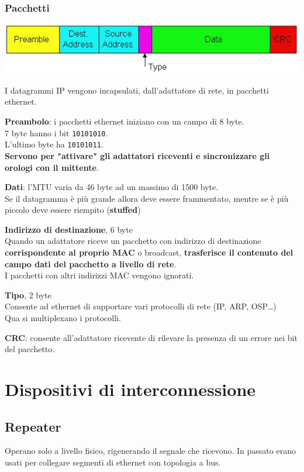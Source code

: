 \documentclass[10pt]{article}
\begin{document}
\subsubsection{Pacchetti}
\begin{center}
	\includegraphics[scale=0.7]{ethernetpkt.png}
\end{center}
I datagrammi IP vengono incapsulati, dall'adattatore di rete, in pacchetti ethernet.
\begin{list}{}{}
	\item \textbf{Preambolo}: i pacchetti ethernet iniziano con un campo di 8 byte.\\
	7 byte hanno i bit \texttt{10101010}.\\
	L'ultimo byte ha \texttt{10101011}.\\
	\textbf{Servono per "attivare" gli adattatori riceventi e sincronizzare gli orologi con il mittente}.
	\item \textbf{Dati}: l'MTU varia da 46 byte ad un massimo di 1500 byte.\\
	Se il datagramma è più grande allora deve essere frammentato, mentre se è più piccolo deve essere riempito (\textbf{stuffed})
	\item \textbf{Indirizzo di destinazione}, 6 byte\\
	Quando un adattatore riceve un pacchetto con indirizzo di destinazione \textbf{corrispondente al proprio MAC} o broadcast, \textbf{trasferisce il contenuto del campo dati del pacchetto a livello di rete}.\\
	I pacchetti con altri indirizzi MAC vengono ignorati.
	\item \textbf{Tipo}, 2 byte\\
	Consente ad ethernet di supportare vari protocolli di rete (IP, ARP, OSP\ldots)\\
	Qua si multiplexano i protocolli.
	\item \textbf{CRC}: consente all'adattatore ricevente di rilevare la presenza di un errore nei bit del pacchetto.
\end{list}
\pagebreak
\section{Dispositivi di interconnessione}
\subsection{Repeater}
Operano solo a livello fisico, rigenerando il segnale che ricevono. In passato erano usati per collegare segmenti di ethernet con topologia a bus.
\end{document}
